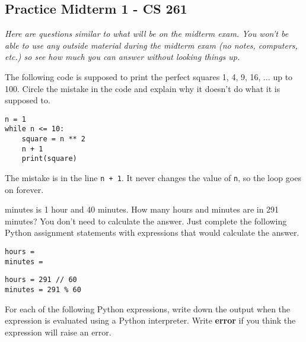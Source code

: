 \documentclass[12pt,answers]{exam}
\begin{document}
\pagestyle{empty}
\graphicspath{{/home/brian/Dropbox/HSC/Spring16/Math111/}}

\subsection*{Practice Midterm 1 - CS 261}
\textit{Here are questions similar to what will be on the midterm exam.  You won't be able to use any outside material during the midterm exam (no notes, computers, etc.) so see how much you can answer without looking things up.}

\begin{questions}

\question The following code is supposed to print the perfect squares 1, 4, 9, 16, $\ldots$ up to 100.  Circle the mistake in the code and explain why it doesn't do what it is supposed to. 
\lstset{language=Python}
\lstset{columns=fixed}
\begin{lstlisting}
n = 1
while n <= 10:
    square = n ** 2
    n + 1
    print(square)
\end{lstlisting}
\begin{solution}
The mistake is in the line \verb|n + 1|.  It never changes the value of \verb|n|, so the loop goes on forever.
\end{solution}
 

 minutes is 1 hour and 40 minutes. How many hours and minutes are in 291 minutes?  You don't need to calculate the answer.  Just complete the following Python assignment statements with expressions that would calculate the answer.
\lstset{language=Python}
\begin{lstlisting}
hours = 
minutes = 
\end{lstlisting}
\begin{solution}
\begin{lstlisting}
hours = 291 // 60
minutes = 291 % 60
\end{lstlisting}

\end{solution}

\question For each of the following Python expressions, write down the output when the expression is evaluated using a Python interpreter. Write \textbf{error} if you think the expression will raise an error.

\end{questions}
\end{document}
